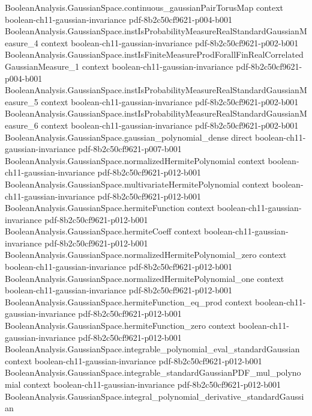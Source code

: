 \begin{theorem}
  {BooleanAnalysis.GaussianSpace.continuous_gaussianPairTorusMap}
  {context}
  {boolean-ch11-gaussian-invariance}
  {pdf-8b2c50cf9621-p004-b001}
\proofstep
  {BooleanAnalysis.GaussianSpace.instIsProbabilityMeasureRealStandardGaussianMeasure_4}
  {context}
  {boolean-ch11-gaussian-invariance}
  {pdf-8b2c50cf9621-p002-b001}
\proofstep
  {BooleanAnalysis.GaussianSpace.instIsFiniteMeasureProdForallFinRealCorrelatedGaussianMeasure_1}
  {context}
  {boolean-ch11-gaussian-invariance}
  {pdf-8b2c50cf9621-p004-b001}
\proofstep
  {BooleanAnalysis.GaussianSpace.instIsProbabilityMeasureRealStandardGaussianMeasure_5}
  {context}
  {boolean-ch11-gaussian-invariance}
  {pdf-8b2c50cf9621-p002-b001}
\proofstep
  {BooleanAnalysis.GaussianSpace.instIsProbabilityMeasureRealStandardGaussianMeasure_6}
  {context}
  {boolean-ch11-gaussian-invariance}
  {pdf-8b2c50cf9621-p002-b001}
\proofstep
  {BooleanAnalysis.GaussianSpace.gaussian_polynomial_dense}
  {direct}
  {boolean-ch11-gaussian-invariance}
  {pdf-8b2c50cf9621-p007-b001}
\proofstep
  {BooleanAnalysis.GaussianSpace.normalizedHermitePolynomial}
  {context}
  {boolean-ch11-gaussian-invariance}
  {pdf-8b2c50cf9621-p012-b001}
\proofstep
  {BooleanAnalysis.GaussianSpace.multivariateHermitePolynomial}
  {context}
  {boolean-ch11-gaussian-invariance}
  {pdf-8b2c50cf9621-p012-b001}
\proofstep
  {BooleanAnalysis.GaussianSpace.hermiteFunction}
  {context}
  {boolean-ch11-gaussian-invariance}
  {pdf-8b2c50cf9621-p012-b001}
\proofstep
  {BooleanAnalysis.GaussianSpace.hermiteCoeff}
  {context}
  {boolean-ch11-gaussian-invariance}
  {pdf-8b2c50cf9621-p012-b001}
\proofstep
  {BooleanAnalysis.GaussianSpace.normalizedHermitePolynomial_zero}
  {context}
  {boolean-ch11-gaussian-invariance}
  {pdf-8b2c50cf9621-p012-b001}
\proofstep
  {BooleanAnalysis.GaussianSpace.normalizedHermitePolynomial_one}
  {context}
  {boolean-ch11-gaussian-invariance}
  {pdf-8b2c50cf9621-p012-b001}
\proofstep
  {BooleanAnalysis.GaussianSpace.hermiteFunction_eq_prod}
  {context}
  {boolean-ch11-gaussian-invariance}
  {pdf-8b2c50cf9621-p012-b001}
\proofstep
  {BooleanAnalysis.GaussianSpace.hermiteFunction_zero}
  {context}
  {boolean-ch11-gaussian-invariance}
  {pdf-8b2c50cf9621-p012-b001}
\proofstep
  {BooleanAnalysis.GaussianSpace.integrable_polynomial_eval_standardGaussian}
  {context}
  {boolean-ch11-gaussian-invariance}
  {pdf-8b2c50cf9621-p012-b001}
\proofstep
  {BooleanAnalysis.GaussianSpace.integrable_standardGaussianPDF_mul_polynomial}
  {context}
  {boolean-ch11-gaussian-invariance}
  {pdf-8b2c50cf9621-p012-b001}
\proofstep
  {BooleanAnalysis.GaussianSpace.integral_polynomial_derivative_standardGaussian}

\end{theorem}
